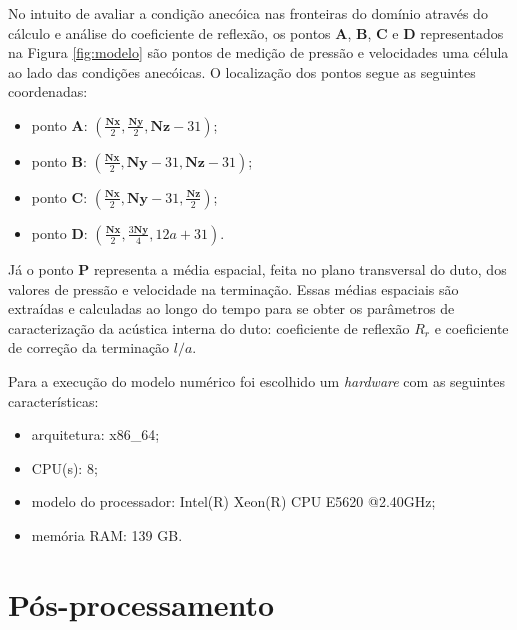 No intuito de avaliar a condição anecóica nas fronteiras do domínio através do cálculo e análise do coeficiente de reflexão, os pontos $\textbf{A}$, $\textbf{B}$, $\textbf{C}$ e $\textbf{D}$ representados na Figura \ref{fig:modelo} são pontos de medição de pressão e velocidades uma célula ao lado das condições anecóicas. O localização dos pontos segue as seguintes coordenadas:

\begin{itemize}
  \item ponto $\textbf{A}$: $(\frac{\textbf{Nx}}{2}, \frac{\textbf{Ny}}{2}, \textbf{Nz} - 31)$;
  \item ponto $\textbf{B}$: $(\frac{\textbf{Nx}}{2}, \textbf{Ny} - 31, \textbf{Nz} - 31)$;
  \item ponto $\textbf{C}$: $(\frac{\textbf{Nx}}{2}, \textbf{Ny} - 31, \frac{\textbf{Nz}}{2})$;
   \item ponto $\textbf{D}$: $(\frac{\textbf{Nx}}{2}, \frac{3\textbf{Ny}}{4}, 12a + 31)$.
\end{itemize}
 
Já o ponto $\textbf{P}$ representa a média espacial, feita no plano transversal do duto, dos valores de pressão e velocidade na terminação. Essas médias espaciais são extraídas e calculadas ao longo do tempo para se obter os parâmetros de caracterização da acústica interna do duto: coeficiente de reflexão $R_{r}$ e coeficiente de correção da terminação $l/a$.

Para a execução do modelo numérico foi escolhido um \textit{hardware} com as seguintes características:

\begin{itemize}
  \item arquitetura: x86\_64;
  \item CPU(s): 8;
  \item modelo do processador: Intel(R) Xeon(R) CPU E5620 @2.40GHz;
  \item memória RAM: 139 GB.
\end{itemize}





\section{Pós-processamento}

